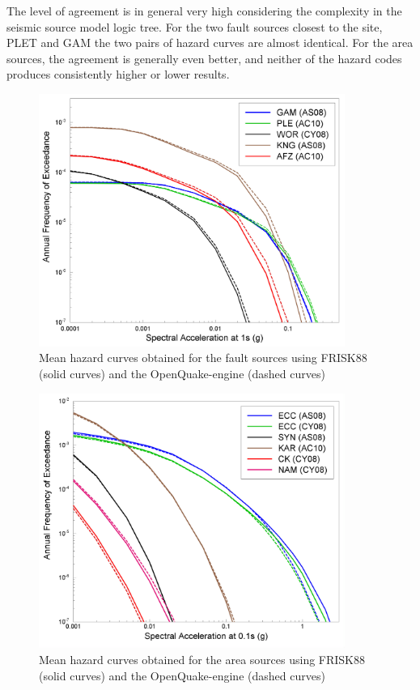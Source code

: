 The level of agreement is in general very high considering the complexity in the
seismic source model logic tree. For the two fault sources closest to the site,
PLET and GAM the two pairs of hazard curves are almost identical. For the area
sources, the agreement is generally even better, and neither of the hazard codes
produces consistently higher or lower results.
%
\begin{figure}
\centering
\includegraphics[width=10cm]{./qareport/pictures/ThyspunktCurvesFault.jpg}
\caption{Mean hazard curves obtained for the fault sources using FRISK88 (solid
curves) and the OpenQuake-engine (dashed curves)}
\label{fig:thyspunkt_curves_fault}
\end{figure}
%
\begin{figure}
\centering
\includegraphics[width=10cm]{./qareport/pictures/ThyspunktCurvesArea.jpg}
\caption{Mean hazard curves obtained for the area sources using FRISK88 (solid curves) and the OpenQuake-engine (dashed curves)}
\label{fig:thyspunkt_curves_area}
\end{figure}

